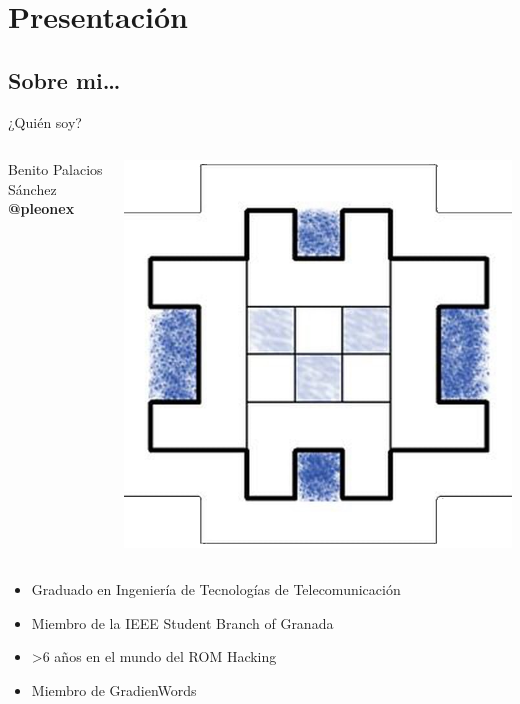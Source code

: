 \section{Presentación}
\subsection{Sobre mi\ldots}
\begin{frame}{¿Quién soy?}

    \begin{columns}
    \begin{column}{0.75\textwidth}
        \Large
        Benito Palacios Sánchez \\
        \textbf{@pleonex}
    \end{column}
    \begin{column}{0.25\textwidth}
        \includegraphics[width=\textwidth]{../pleonex.png}
    \end{column}
    \end{columns}

    \vfill
    \setlength{\leftmargini}{0em}
    \begin{itemize}
        \item<2-> Graduado en Ingeniería de Tecnologías de Telecomunicación
        \item<3-> Miembro de la IEEE Student Branch of Granada
        \item<4-> \textgreater 6 años en el mundo del ROM Hacking
        \item<5-> Miembro de GradienWords
    \end{itemize}
\end{frame}

